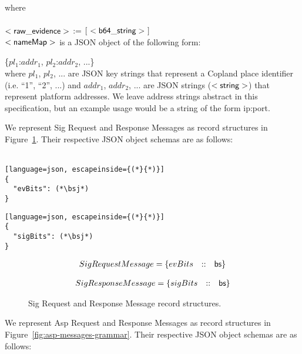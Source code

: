 \noindent where \\ \\
\noindent $\mathsf{<raw\_evidence>}$ := $[~\mathsf{<b64\_string>}~]$ \\

\noindent $\mathsf{<nameMap>}$ is a JSON object of the following form:

\{$pl_1$:$addr_1$, $pl_2$:$addr_2$, ...\} \\

\noindent where $pl_1$, $pl_2$, ... are JSON key strings that
represent a Copland place identifier (i.e. ``1'', ``2'', ...) and
$addr_1$, $addr_2$, ... are JSON strings ($\mathsf{<string>}$) that represent
platform addresses.  We leave address strings abstract in this
specification, but an example usage would be a string of the form
ip:port.

We represent Sig Request and Response Messages as record structures in
Figure~\ref{fig:sig-messages-grammar}.  Their respective JSON object
schemas are as follows: \\ \\


\begin{lstlisting}[language=json, escapeinside={(*}{*)}]
{
  "evBits": (*\bsj*)
}
\end{lstlisting}

\begin{lstlisting}[language=json, escapeinside={(*}{*)}]
{
  "sigBits": (*\bsj*)
}
\end{lstlisting}

\begin{figure}

\[\begin{array}{rcl}
      SigRequestMessage = \{ evBits &:: &\mathsf{bs} \}
  \end{array}\]

\[\begin{array}{rcl}
      SigResponseMessage = \{ sigBits &:: &\mathsf{bs} \}
  \end{array}\]

  \caption{Sig Request and Response Message record structures.}\label{fig:sig-messages-grammar}
\end{figure}

\newpage

We represent Asp Request and Response Messages as record structures in
Figure~\ref{fig:asp-messages-grammar}.  Their respective JSON object
schemas are as follows: \\ \\

